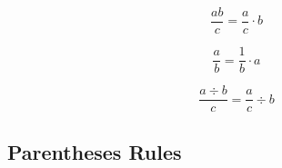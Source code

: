 \begin{definition}
    \begin{equation}
        \frac{ab}{c} = \frac{a}{c} \cdot b \label{eq-17}
    \end{equation}

    \begin{equation}
        \frac{a}{b} = \frac{1}{b} \cdot a \label{eq-18}
    \end{equation}

    \begin{equation}
        \frac{a \div b}{c} = \frac{a}{c} \div b \label{eq-19}
    \end{equation}
    
\end{definition}


\vspace{0.5cm}\subsection{Parentheses Rules}

